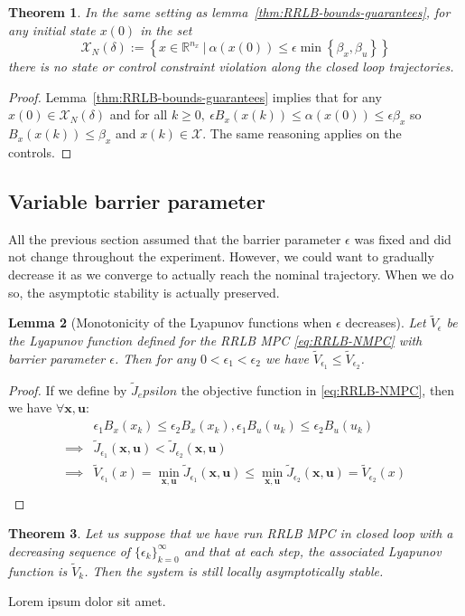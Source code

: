 \documentclass[conference]{IEEEtran}
\newtheorem{theorem}{Theorem}[section]
\newtheorem{lemma}[theorem]{Lemma}
\theoremstyle{definition}
\theoremstyle{remark}
\def\cal#1{\mathcal{#1}}
\def\bf#1{\mathbf{#1}}
\newcommand{\R}{\mathbb{R}}
\begin{document}
\begin{theorem}
	In the same setting as lemma~\ref{thm:RRLB-bounds-guarantees}, for any initial state $x(0)$ in the set
	$$\cal{X}_N(\delta):=\left\{x\in\R^{n_x}~|~\alpha(x(0))\leq\epsilon\min\left\{\beta_x,\beta_u\right\}\right\}$$
	there is no state or control constraint violation along the closed loop trajectories.
\end{theorem}

\begin{proof}
	Lemma~\ref{thm:RRLB-bounds-guarantees} implies that for any $x(0)\in\cal{X}_N(\delta)$ and for all $k\geq 0,~\epsilon B_x(x(k))\leq\alpha(x(0))\leq\epsilon\beta_x$ so $B_x(x(k))\leq \beta_x$ and $x(k)\in\cal{X}$.
	The same reasoning applies on the controls.
\end{proof}

\subsection{Variable barrier parameter}
All the previous section assumed that the barrier parameter $\epsilon$ was fixed and did not change throughout the experiment.
However, we could want to gradually decrease it as we converge to actually reach the nominal trajectory.
When we do so, the asymptotic stability is actually preserved.

\begin{lemma}[Monotonicity of the Lyapunov functions when $\epsilon$ decreases]
	Let $\tilde{V}_{\epsilon}$ be the Lyapunov function defined for the RRLB MPC \ref{eq:RRLB-NMPC} with barrier parameter $\epsilon$.
	Then for any $0<\epsilon_1<\epsilon_2$ we have $\tilde{V}_{\epsilon_1}\leq\tilde{V}_{\epsilon_2}$.
\end{lemma}

\begin{proof}
	If we define by $\tilde{J}_epsilon$ the objective function in \eqref{eq:RRLB-NMPC}, then we have $\forall \bf{x},\bf{u}$:
	\begin{align*}
		&\epsilon_1B_x(x_k)\leq \epsilon_2B_x(x_k),\epsilon_1B_u(u_k)\leq \epsilon_2B_u(u_k)\\
		\implies&\tilde{J}_{\epsilon_1}(\bf{x},\bf{u})<\tilde{J}_{\epsilon_2}(\bf{x},\bf{u})\\
		\implies&\tilde{V}_{\epsilon_1}(x)=\min_{\bf{x},\bf{u}}\tilde{J}_{\epsilon_1}(\bf{x},\bf{u})\leq\min_{\bf{x},\bf{u}}\tilde{J}_{\epsilon_2}(\bf{x},\bf{u}) = \tilde{V}_{\epsilon_2}(x)\\
	\end{align*}
\end{proof}

\begin{theorem}
	Let us suppose that we have run RRLB MPC in closed loop with a decreasing sequence of $\{\epsilon_k\}_{k=0}^\infty$ and that at each step, the associated Lyapunov function is $\tilde{V}_{k}$.
	Then the system is still locally asymptotically stable.
\end{theorem}


\appendix
Lorem ipsum dolor sit amet.

\printbibliography

\end{document}
